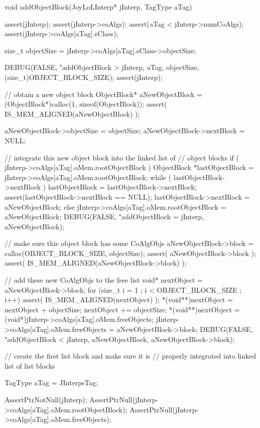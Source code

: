 \startCCode
void addObjectBlock(JoyLoLInterp* jInterp, TagType aTag) {
  assert(jInterp);
  assert(jInterp->coAlgs);
  assert(aTag < jInterp->numCoAlgs);
  assert(jInterp->coAlgs[aTag].sClass);

  size_t objectSize = jInterp->coAlgs[aTag].sClass->objectSize;

  DEBUG(FALSE, "addObjectBlock > %
    jInterp, aTag, objectSize, (size_t)OBJECT_BLOCK_SIZE);
  assert(jInterp);
  
  // obtain a new object block
  ObjectBlock* aNewObjectBlock = 
    (ObjectBlock*)calloc(1, sizeof(ObjectBlock));
  assert( IS_MEM_ALIGNED(aNewObjectBlock) );

  aNewObjectBlock->objectSize = objectSize;
  aNewObjectBlock->nextBlock  = NULL;
  
  // integrate this new object block into the linked list of
  // object blocks
  if ( jInterp->coAlgs[aTag].oMem.rootObjectBlock ) {
    ObjectBlock *lastObjectBlock = jInterp->coAlgs[aTag].oMem.rootObjectBlock;
    while ( lastObjectBlock->nextBlock ) {
      lastObjectBlock = lastObjectBlock->nextBlock;
    }
    assert(lastObjectBlock->nextBlock == NULL);
    lastObjectBlock->nextBlock = aNewObjectBlock;
  } else {
    jInterp->coAlgs[aTag].oMem.rootObjectBlock = aNewObjectBlock;
  }
  DEBUG(FALSE, "addObjectBlock = %
    jInterp, aNewObjectBlock);

  // make sure this object block has some CoAlgObjs
  aNewObjectBlock->block = 
    calloc(OBJECT_BLOCK_SIZE, objectSize);
  assert( aNewObjectBlock->block );
  assert( IS_MEM_ALIGNED(aNewObjectBlock->block) );
  
  // add these new CoAlgObjs to the free list
  void* nextObject = aNewObjectBlock->block;
  for (size_t i = 1 ; i < OBJECT_BLOCK_SIZE ; i++) {
    assert( IS_MEM_ALIGNED(nextObject) );
    *(void**)nextObject = nextObject + objectSize;
    nextObject += objectSize;
  }
  *(void**)nextObject =
    (void*)jInterp->coAlgs[aTag].oMem.freeObjects;
  jInterp->coAlgs[aTag].oMem.freeObjects = aNewObjectBlock->block;
  DEBUG(FALSE, "addObjectBlock < %
    jInterp, aNewObjectBlock, aNewObjectBlock->block);
}
\stopCCode

\startCTest
  // create the first list block and make sure it is 
  // properly integrated into linked list of list blocks

  TagType aTag = JInterpsTag;
    
  AssertPtrNotNull(jInterp);
  AssertPtrNull(jInterp->coAlgs[aTag].oMem.rootObjectBlock);
  AssertPtrNull(jInterp->coAlgs[aTag].oMem.freeObjects);

